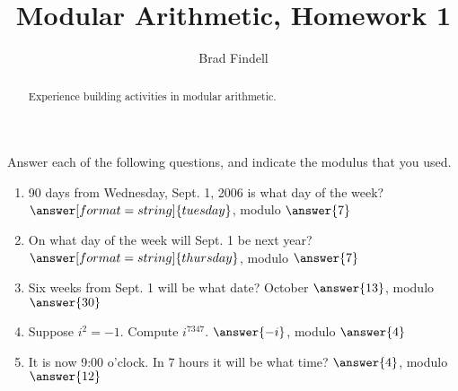 \documentclass[space,nooutcomes,handout]{ximera}
\title{Modular Arithmetic, Homework 1}
\author{Brad Findell}
\begin{document}
\begin{abstract}
Experience building activities in modular arithmetic.  
\end{abstract}
\maketitle

\begin{problem}
Answer each of the following questions, and indicate the modulus that you used.  
\begin{enumerate}
\item 90 days from Wednesday, Sept. 1, 2006 is what day of the week?  $\answer[format=string]{tuesday}$, modulo $\answer{7}$
\item On what day of the week will Sept. 1 be next year? $\answer[format=string]{thursday}$, modulo $\answer{7}$
\item Six weeks from Sept. 1 will be what date? October $\answer{13}$, modulo $\answer{30}$
\item Suppose $i^2 = -1$.  Compute $i^{7347}$. $\answer{-i}$, modulo $\answer{4}$
\item It is now 9:00 o'clock.  In 7 hours it will be what time? $\answer{4}$, modulo $\answer{12}$
\end{enumerate}
\end{problem}
\end{document}
